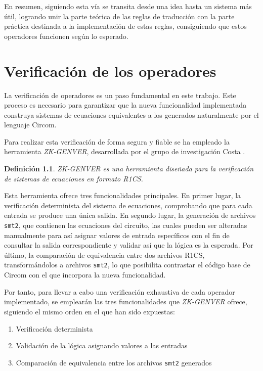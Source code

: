 \documentclass[a4paper,12pt]{report}
\newtheorem{definicion}{Definición}
\begin{document}
	\vspace{0.2cm}
	\noindent En resumen, siguiendo esta vía se transita desde una idea hasta un sistema más útil, logrando unir la parte teórica de las reglas de traducción con la parte práctica destinada a la implementación de estas reglas, consiguiendo que estos operadores funcionen según lo esperado.
	
	\chapter{Verificación de los operadores}
	
	\noindent La verificación de operadores es un paso fundamental en este trabajo. Este proceso es necesario para garantizar que la nueva funcionalidad implementada construya sistemas de ecuaciones equivalentes a los generados naturalmente por el lenguaje Circom.
	
	\vspace{0.2cm}
	\noindent Para realizar esta verificación de forma segura y fiable se ha empleado la herramienta \textit{ZK-GENVER}, desarrollada por el grupo de investigación Costa \cite{costa_group_zkgenver}.
	
	
	\begin{definicion}
		ZK-GENVER es una herramienta diseñada para la verificación de sistemas de ecuaciones en formato R1CS. 
	\end{definicion}
	
	\noindent Esta herramienta ofrece tres funcionalidades principales. En primer lugar, la verificación determinista del sistema de ecuaciones, comprobando que para cada entrada se produce una única salida. En segundo lugar, la generación de archivos \texttt{smt2}, que contienen las ecuaciones del circuito, las cuales pueden ser alteradas manualmente para así asignar valores de entrada específicos con el fin de consultar la salida correspondiente y validar así que la lógica es la esperada. Por último, la comparación de equivalencia entre dos archivos R1CS, transformándolos a archivos \texttt{smt2}, lo que posibilita contrastar el código base de Circom con el que incorpora la nueva funcionalidad.
	
	\vspace{0.2cm}
	\noindent Por tanto, para llevar a cabo una verificación exhaustiva de cada operador implementado, se emplearán las tres funcionalidades que \textit{ZK-GENVER} ofrece, siguiendo el mismo orden en el que han sido expuestas:
	
	\begin{enumerate}
		\item Verificación determinista
		\item Validación de la lógica asignando valores a las entradas
		\item Comparación de equivalencia entre los archivos \texttt{smt2} generados
	\end{enumerate}
	
\end{document}
